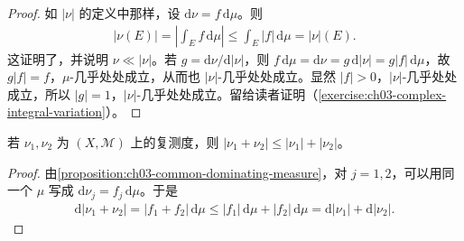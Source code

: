 \documentclass[../../main.tex]{subfiles}%
\begin{document}
\begin{proof}
如 $|\nu|$ 的定义中那样，设 $\mathrm{d}\nu=f\,\mathrm{d}\mu$。则
\begin{align*}
|\nu(E)|=\left|\int_E f\,\mathrm{d}\mu\right|\le\int_E|f|\,\mathrm{d}\mu=|\nu|(E).
\end{align*}
这证明了，并说明 $\nu\ll|\nu|$。若 $g=\mathrm{d}\nu/\mathrm{d}|\nu|$，则 $f\,\mathrm{d}\mu=\mathrm{d}\nu=g\,\mathrm{d}|\nu|=g|f|\,\mathrm{d}\mu$，故 $g|f|=f$，$\mu$-几乎处处成立，从而也 $|\nu|$-几乎处处成立。显然 $|f|>0$，$|\nu|$-几乎处处成立，所以 $|g|=1$，$|\nu|$-几乎处处成立。留给读者证明（\cref{exercise:ch03-complex-integral-variation}）。
\end{proof}
\begin{proposition}\label{proposition:ch03-complex-variation-triangle}
若 $\nu_1,\nu_2$ 为 $(X,\mathscr{M})$ 上的复测度，则 $|\nu_1+\nu_2|\le|\nu_1|+|\nu_2|$。
\end{proposition}
\begin{proof}
由\cref{proposition:ch03-common-dominating-measure}，对 $j=1,2$，可以用同一个 $\mu$ 写成 $\mathrm{d}\nu_j=f_j\,\mathrm{d}\mu$。于是
\begin{align*}
\mathrm{d}|\nu_1+\nu_2|
=|f_1+f_2|\,\mathrm{d}\mu
\le|f_1|\,\mathrm{d}\mu+|f_2|\,\mathrm{d}\mu
=\mathrm{d}|\nu_1|+\mathrm{d}|\nu_2|.
\end{align*}
\end{proof}
\end{document}

